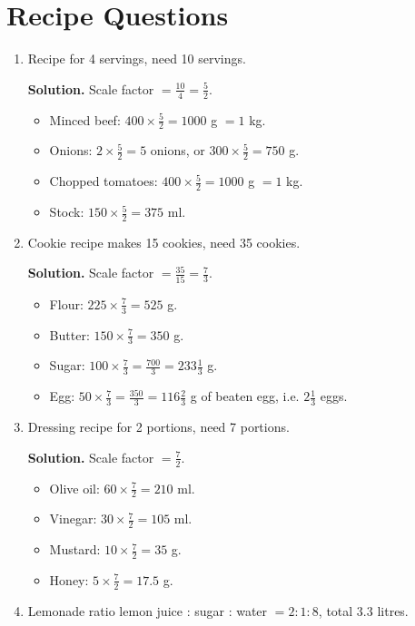 \documentclass[12pt,a4paper]{article}
\begin{document}
\section*{Recipe Questions}
\begin{enumerate}
\item Recipe for 4 servings, need 10 servings.

\textbf{Solution.} Scale factor \(=\frac{10}{4}=\frac52\).

\begin{itemize}
\item Minced beef: \(400\times\frac52=1000\) g \(=1\) kg.
\item Onions: \(2\times\frac52=5\) onions, or \(300\times\frac52=750\) g.
\item Chopped tomatoes: \(400\times\frac52=1000\) g \(=1\) kg.
\item Stock: \(150\times\frac52=375\) ml.
\end{itemize}

\item Cookie recipe makes 15 cookies, need 35 cookies.

\textbf{Solution.} Scale factor \(=\frac{35}{15}=\frac73\).

\begin{itemize}
\item Flour: \(225\times\frac73=525\) g.
\item Butter: \(150\times\frac73=350\) g.
\item Sugar: \(100\times\frac73=\frac{700}{3}=233\frac13\) g.
\item Egg: \(50\times\frac73=\frac{350}{3}=116\frac23\) g of beaten egg, i.e. \(2\frac13\) eggs.
\end{itemize}

\item Dressing recipe for 2 portions, need 7 portions.

\textbf{Solution.} Scale factor \(=\frac72\).

\begin{itemize}
\item Olive oil: \(60\times\frac72=210\) ml.
\item Vinegar: \(30\times\frac72=105\) ml.
\item Mustard: \(10\times\frac72=35\) g.
\item Honey: \(5\times\frac72=17.5\) g.
\end{itemize}

\item Lemonade ratio lemon juice : sugar : water \(=2:1:8\), total \(3.3\) litres.


\end{enumerate}
\end{document}
